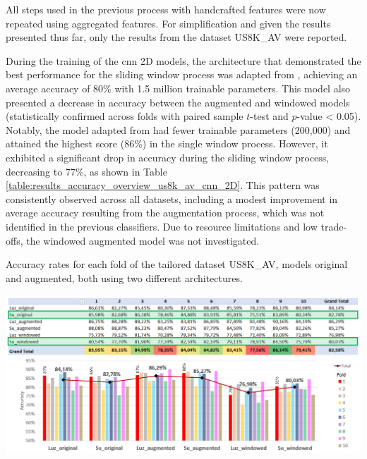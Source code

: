 
All steps used in the previous process with handcrafted features were now repeated using aggregated features. For simplification and given the results presented thus far, only the results from the dataset US8K\_AV were reported.

During the training of the \gls{cnn} 2D models, the architecture that demonstrated the best performance for the sliding window process was adapted from \textcite{Su2020}, achieving an average accuracy of 80\% with 1.5 million trainable parameters. This model also presented a decrease in accuracy between the augmented and windowed models (statistically confirmed across folds with paired sample $t$-test and $p$-value < 0.05). Notably, the model adapted from \textcite{Luz2021} had fewer trainable parameters (200,000) and attained the highest score (86\%) in the single window process. However, it exhibited a significant drop in accuracy during the sliding window process, decreasing to 77\%, as shown in Table \ref{table:results_accuracy_overview_us8k_av_cnn_2D}. This pattern was consistently observed across all datasets, including a modest improvement in average accuracy resulting from the augmentation process, which was not identified in the previous classifiers. Due to resource limitations and low trade-offs, the windowed augmented model was not investigated.

\begin{table}[ht!]
    \caption[Accuracy rates for each fold of the tailored dataset US8K\_AV.]{Accuracy rates for each fold of the tailored dataset US8K\_AV, models original and augmented, both using two different architectures.}
    \label{table:results_accuracy_overview_us8k_av_cnn_2D}
     \raggedright
    \includegraphics[width=1\textwidth]{resources/images/060-results/Results_classification_overview_us8k_av_cnn2d.png}
\end{table}


